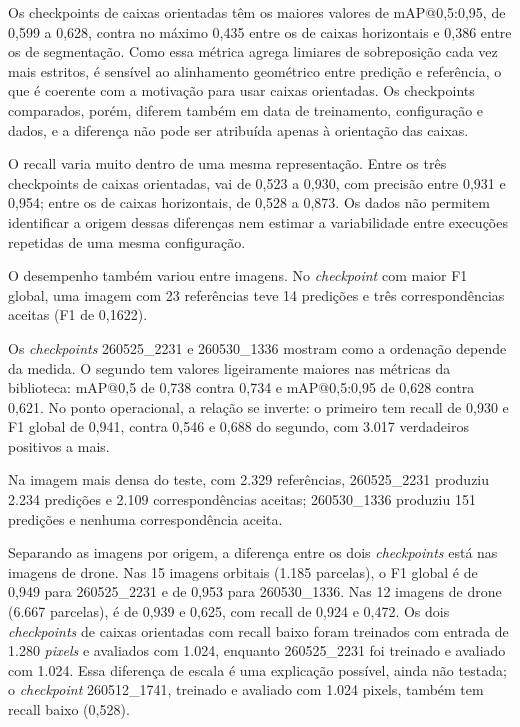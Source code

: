 Os checkpoints de caixas orientadas t\^em os maiores valores de mAP@0,5:0,95, de 0,599 a 0,628, contra no m\'aximo 0,435 entre os de caixas horizontais e 0,386 entre os de segmenta\c{c}\~ao. Como essa m\'etrica agrega limiares de sobreposi\c{c}\~ao cada vez mais estritos, \'e sens\'ivel ao alinhamento geom\'etrico entre predi\c{c}\~ao e refer\^encia, o que \'e coerente com a motiva\c{c}\~ao para usar caixas orientadas. Os checkpoints comparados, por\'em, diferem tamb\'em em data de treinamento, configura\c{c}\~ao e dados, e a diferen\c{c}a n\~ao pode ser atribu\'ida apenas \`a orienta\c{c}\~ao das caixas.

O recall varia muito dentro de uma mesma representa\c{c}\~ao. Entre os tr\^es checkpoints de caixas orientadas, vai de 0,523 a 0,930, com precis\~ao entre 0,931 e 0,954; entre os de caixas horizontais, de 0,528 a 0,873. Os dados n\~ao permitem identificar a origem dessas diferen\c{c}as nem estimar a variabilidade entre execu\c{c}\~oes repetidas de uma mesma configura\c{c}\~ao.

O desempenho tamb\'em variou entre imagens. No \textit{checkpoint} com maior F1 global, uma imagem com 23 refer\^encias teve 14 predi\c{c}\~oes e tr\^es correspond\^encias aceitas (F1 de 0,1622).

Os \textit{checkpoints} 260525\_2231 e 260530\_1336 mostram como a ordena\c{c}\~ao depende da medida. O segundo tem valores ligeiramente maiores nas m\'etricas da biblioteca: mAP@0,5 de 0,738 contra 0,734 e mAP@0,5:0,95 de 0,628 contra 0,621. No ponto operacional, a rela\c{c}\~ao se inverte: o primeiro tem recall de 0,930 e F1 global de 0,941, contra 0,546 e 0,688 do segundo, com 3.017 verdadeiros positivos a mais.

Na imagem mais densa do teste, com 2.329 refer\^encias, 260525\_2231 produziu 2.234 predi\c{c}\~oes e 2.109 correspond\^encias aceitas; 260530\_1336 produziu 151 predi\c{c}\~oes e nenhuma correspond\^encia aceita.

Separando as imagens por origem, a diferen\c{c}a entre os dois \textit{checkpoints} est\'a nas imagens de drone. Nas 15 imagens orbitais (1.185 parcelas), o F1 global \'e de 0,949 para 260525\_2231 e de 0,953 para 260530\_1336. Nas 12 imagens de drone (6.667 parcelas), \'e de 0,939 e 0,625, com recall de 0,924 e 0,472. Os dois \textit{checkpoints} de caixas orientadas com recall baixo foram treinados com entrada de 1.280 \textit{pixels} e avaliados com 1.024, enquanto 260525\_2231 foi treinado e avaliado com 1.024. Essa diferen\c{c}a de escala \'e uma explica\c{c}\~ao poss\'ivel, ainda n\~ao testada; o \textit{checkpoint} 260512\_1741, treinado e avaliado com 1.024 pixels, tamb\'em tem recall baixo (0,528).

